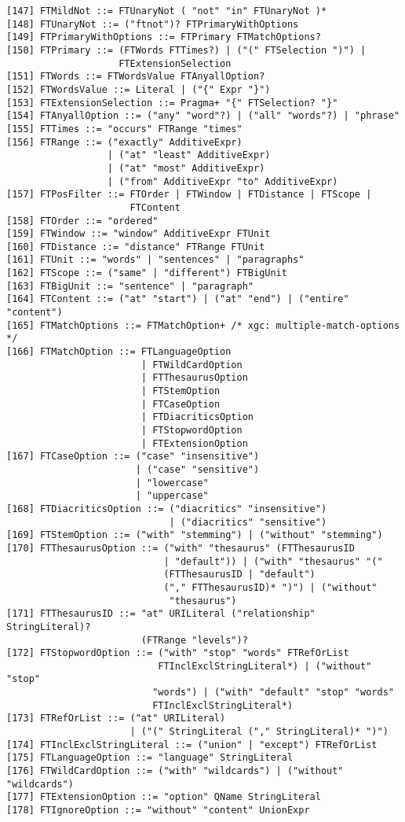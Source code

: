 \begin{Verbatim}[frame=none, fontsize=\footnotesize]
[147] FTMildNot ::= FTUnaryNot ( "not" "in" FTUnaryNot )*
[148] FTUnaryNot ::= ("ftnot")? FTPrimaryWithOptions
[149] FTPrimaryWithOptions ::= FTPrimary FTMatchOptions?
[150] FTPrimary ::= (FTWords FTTimes?) | ("(" FTSelection ")") |
                    FTExtensionSelection 
[151] FTWords ::= FTWordsValue FTAnyallOption?
[152] FTWordsValue ::= Literal | ("{" Expr "}")
[153] FTExtensionSelection ::= Pragma+ "{" FTSelection? "}"
[154] FTAnyallOption ::= ("any" "word"?) | ("all" "words"?) | "phrase"
[155] FTTimes ::= "occurs" FTRange "times"
[156] FTRange ::= ("exactly" AdditiveExpr)
                  | ("at" "least" AdditiveExpr)
                  | ("at" "most" AdditiveExpr)
                  | ("from" AdditiveExpr "to" AdditiveExpr)
[157] FTPosFilter ::= FTOrder | FTWindow | FTDistance | FTScope |
                      FTContent 
[158] FTOrder ::= "ordered"
[159] FTWindow ::= "window" AdditiveExpr FTUnit
[160] FTDistance ::= "distance" FTRange FTUnit
[161] FTUnit ::= "words" | "sentences" | "paragraphs"
[162] FTScope ::= ("same" | "different") FTBigUnit
[163] FTBigUnit ::= "sentence" | "paragraph"
[164] FTContent ::= ("at" "start") | ("at" "end") | ("entire" "content")
[165] FTMatchOptions ::= FTMatchOption+	/* xgc: multiple-match-options */
[166] FTMatchOption ::= FTLanguageOption
                        | FTWildCardOption
                        | FTThesaurusOption
                        | FTStemOption
                        | FTCaseOption
                        | FTDiacriticsOption
                        | FTStopwordOption
                        | FTExtensionOption
[167] FTCaseOption ::= ("case" "insensitive")
                       | ("case" "sensitive")
                       | "lowercase"
                       | "uppercase"
[168] FTDiacriticsOption ::= ("diacritics" "insensitive")
                             | ("diacritics" "sensitive")
[169] FTStemOption ::= ("with" "stemming") | ("without" "stemming")
[170] FTThesaurusOption ::= ("with" "thesaurus" (FTThesaurusID 
                            | "default")) | ("with" "thesaurus" "("
                            (FTThesaurusID | "default")
                            ("," FTThesaurusID)* ")") | ("without"
                             "thesaurus")
[171] FTThesaurusID ::= "at" URILiteral ("relationship" StringLiteral)?
                        (FTRange "levels")?
[172] FTStopwordOption ::= ("with" "stop" "words" FTRefOrList
                           FTInclExclStringLiteral*) | ("without" "stop"
                          "words") | ("with" "default" "stop" "words"  
                          FTInclExclStringLiteral*) 
[173] FTRefOrList ::= ("at" URILiteral)
                      | ("(" StringLiteral ("," StringLiteral)* ")")
[174] FTInclExclStringLiteral ::= ("union" | "except") FTRefOrList
[175] FTLanguageOption ::= "language" StringLiteral
[176] FTWildCardOption ::= ("with" "wildcards") | ("without" "wildcards")
[177] FTExtensionOption ::= "option" QName StringLiteral
[178] FTIgnoreOption ::= "without" "content" UnionExpr
\end{Verbatim}


